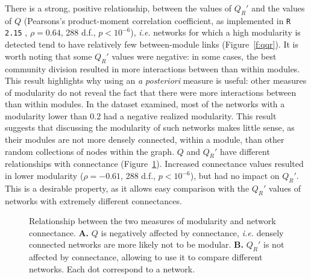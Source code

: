 \documentclass[12pt,oneside]{article}
\begin{document}
There is a strong, positive relationship, between the values of $Q_R'$ and
the values of $Q$ (Pearsons's product-moment correlation coefficient, as
implemented in \texttt{R 2.15} \cite{team_r:_2008}, $\rho = 0.64$, 288 d.f.,
$p < 10^{-6}$), \emph{i.e.} networks for which a high modularity is detected
tend to have relatively few between-module links (Figure~\ref{f:qqr}). It
is worth noting that some $Q_R'$ values were negative: in some cases, the
best community division resulted in more interactions between than within
modules. This result highlights why using an \emph{a posteriori} measure is
useful: other measures of modularity do not reveal the fact that there were
more interactions between than within modules. In the dataset examined,
most of the networks with a modularity lower than 0.2 had a negative
realized modularity. This result suggests that discussing the modularity
of such networks makes little sense, as their modules are not more densely
connected, within a module, than other random collections of nodes within
the graph. $Q$ and $Q_R'$ have different relationships with connectance
(Figure~\ref{f:co}). Increased connectance values resulted in lower modularity
($\rho = -0.61$, 288 d.f., $p < 10^{-6}$), but had no impact on $Q_R'$. This
is a desirable property, as it allows easy comparison with the $Q_R'$ values
of networks with extremely different connectances.

\begin{figure}[tbp]
\begin{center}
%		
\end{center}
\caption{Relationship between the two measures of modularity and network connectance. \textbf{A.} $Q$ is negatively affected by connectance, \emph{i.e.} densely connected networks are more likely not to be modular. \textbf{B.} $Q_R'$ is not affected by connectance, allowing to use it to compare different networks. Each dot correspond to a network.}
\label{f:co}
\end{figure}
\end{document}
